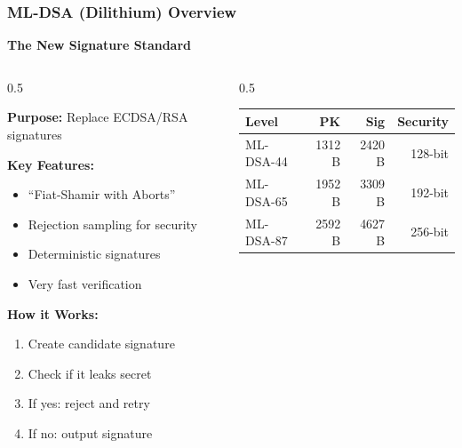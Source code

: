\documentclass[aspectratio=169,10pt]{beamer}
\newcommand{\slideheader}[1]{\frametitle{#1}}
\theoremstyle{plain}
\begin{document}
\begin{frame}
  \slideheader{ML-DSA (Dilithium) Overview}
  
  \begin{center}
    \textbf{\large The New Signature Standard}
  \end{center}
  
  \vspace{0.3cm}
  
  \begin{columns}[T]
    \begin{column}{0.5\textwidth}

    \textbf{Purpose:} Replace ECDSA/RSA signatures
    
    \vspace{0.3cm}
    
    \textbf{Key Features:}
    \begin{itemize}
      \item ``Fiat-Shamir with Aborts''
      \item Rejection sampling for security
      \item Deterministic signatures
      \item Very fast verification
    \end{itemize}
    
    \vspace{0.3cm}
    
    \textbf{How it Works:}
    \begin{enumerate}
      \item Create candidate signature
      \item Check if it leaks secret
      \item If yes: reject and retry
      \item If no: output signature
    \end{enumerate}
  
    \end{column}
    \begin{column}{0.5\textwidth}

    \begin{tabular}{|l|r|r|r|}
      \hline
      \textbf{Level} & \textbf{PK} & \textbf{Sig} & \textbf{Security} \\
      \hline
      ML-DSA-44 & 1312 B & 2420 B & 128-bit \\
      ML-DSA-65 & 1952 B & 3309 B & 192-bit \\
      ML-DSA-87 & 2592 B & 4627 B & 256-bit \\
      \hline
    \end{tabular}
    

\end{column}
\end{columns}
\end{frame}
\end{document}
